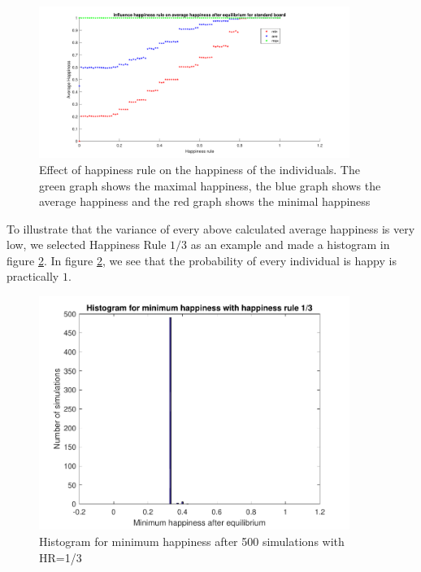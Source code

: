\begin{figure}[h!]
    \centering
    \includegraphics[width=0.9\textwidth]{happinessregel-gemhappinesseind-2.pdf}
    \caption{Effect of happiness rule on the happiness of the individuals. The green graph shows the maximal happiness, the blue graph shows the average happiness and the red graph shows the minimal happiness}
    \label{happyhappy}
\end{figure}

To illustrate that the variance of every above calculated average happiness is very low, we  selected Happiness Rule $1/3$ as an example and made a histogram in figure \ref{minhappy}. 
In figure \ref{minhappy}, we see that the probability of every individual is happy is practically $1$.

\begin{figure}[H]
    \centering
    \includegraphics[width=0.9\textwidth]{histogram_min_happiness_een_derde.pdf}
    \caption{Histogram for minimum happiness after 500 simulations with HR=1/3 }
    \label{minhappy}
\end{figure}

